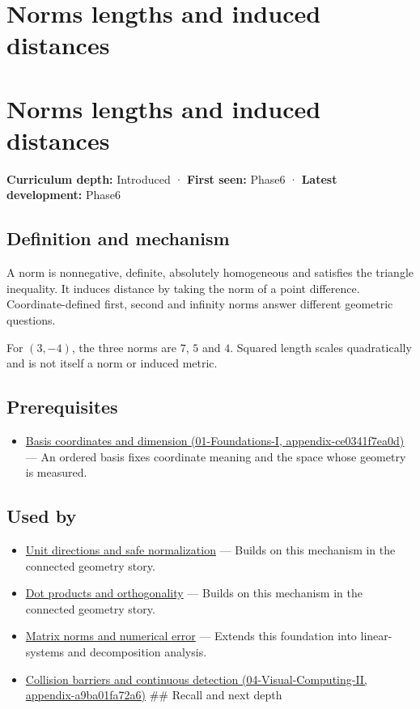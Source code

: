 \hypertarget{appendix-49933872bb51}{}
\section*{Norms lengths and induced distances}
\section{Norms lengths and induced distances}\label{norms-lengths-and-induced-distances}

\textbf{Curriculum depth:} Introduced · \textbf{First seen:} Phase6 · \textbf{Latest development:} Phase6

\subsection{Definition and mechanism}\label{definition-and-mechanism}

A norm is nonnegative, definite, absolutely homogeneous and satisfies the triangle inequality. It induces distance by taking the norm of a point difference. Coordinate-defined first, second and infinity norms answer different geometric questions.

For \((3,-4)\), the three norms are \(7\), \(5\) and \(4\). Squared length scales quadratically and is not itself a norm or induced metric.

\subsection{Prerequisites}\label{prerequisites}

\begin{itemize}
\tightlist
\item
  \href{}{Basis coordinates and dimension (01-Foundations-I, appendix-ce0341f7ea0d)} --- An ordered basis fixes coordinate meaning and the space whose geometry is measured.
\end{itemize}

\subsection{Used by}\label{used-by}

\begin{itemize}
\item
  \hyperref[appendix-f744e41b95b4]{Unit directions and safe normalization} --- Builds on this mechanism in the connected geometry story.
\item
  \hyperref[appendix-8bc4e8fc547c]{Dot products and orthogonality} --- Builds on this mechanism in the connected geometry story.
\item
  \hyperref[appendix-f8657bac66e5]{Matrix norms and numerical error} --- Extends this foundation into linear-systems and decomposition analysis.
\item
  \href{}{Collision barriers and continuous detection (04-Visual-Computing-II, appendix-a9ba01fa72a6)} \#\# Recall and next depth
\end{itemize}

